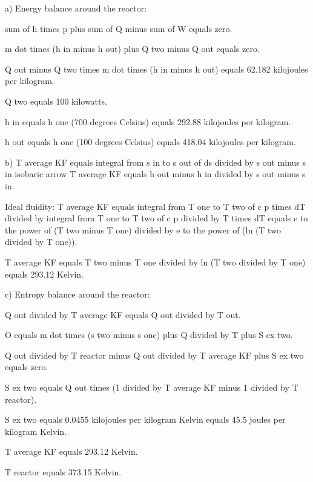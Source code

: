 a) Energy balance around the reactor:

sum of h times p plus sum of Q minus sum of W equals zero.

m dot times (h in minus h out) plus Q two minus Q out equals zero.

Q out minus Q two times m dot times (h in minus h out) equals 62.182 kilojoules per kilogram.

Q two equals 100 kilowatts.

h in equals h one (700 degrees Celsius) equals 292.88 kilojoules per kilogram.

h out equals h one (100 degrees Celsius) equals 418.04 kilojoules per kilogram.

b) T average KF equals integral from s in to s out of ds divided by s out minus s in isobaric arrow T average KF equals h out minus h in divided by s out minus s in.

Ideal fluidity: T average KF equals integral from T one to T two of c p times dT divided by integral from T one to T two of c p divided by T times dT equals e to the power of (T two minus T one) divided by e to the power of (ln (T two divided by T one)).

T average KF equals T two minus T one divided by ln (T two divided by T one) equals 293.12 Kelvin.

c) Entropy balance around the reactor:

Q out divided by T average KF equals Q out divided by T out.

O equals m dot times (s two minus s one) plus Q divided by T plus S ex two.

Q out divided by T reactor minus Q out divided by T average KF plus S ex two equals zero.

S ex two equals Q out times (1 divided by T average KF minus 1 divided by T reactor).

S ex two equals 0.0455 kilojoules per kilogram Kelvin equals 45.5 joules per kilogram Kelvin.

T average KF equals 293.12 Kelvin.

T reactor equals 373.15 Kelvin.